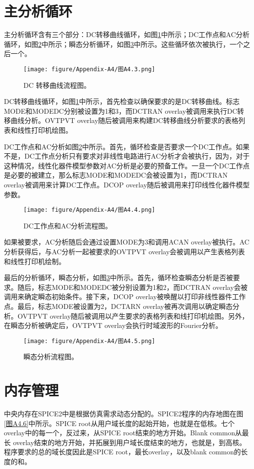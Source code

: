 \section{主分析循环}
主分析循环含有三个部分：DC转移曲线循环，如图\ref{图A4.3}中所示；DC工作点和AC分析循环，如图\ref{图A4.4}中所示；瞬态分析循环，如图\ref{图A4.5}中所示。这些循环依次被执行，一个之后一个。
\begin{figure}[htbp]
\small
    \centering
    \texttt{[image: figure/Appendix-A4/图A4.3.png]}
    \caption{DC 转移曲线流程图。}
    \label{图A4.3}
\end{figure}

DC转移曲线循环，如图\ref{图A4.3}中所示，首先检查以确保要求的是DC转移曲线。标志MODE和MODEDC分别被设置为1和3，而DCTRAN overlay被调用来执行DC转移曲线分析。OVTPVT overlay随后被调用来构建DC转移曲线分析要求的表格列表和线性打印机绘图。

DC工作点和AC分析如图\ref{图A4.4}中所示。首先，循环检查是否要求一个DC工作点。如果不是，DC工作点分析只有要求对非线性电路进行AC分析才会被执行，因为，对于这种情况，线性化器件模型参数对AC分析是必要的预备工作。一旦一个DC工作点是必要的被建立，那么标志MODE和MODEDC会被设置为1，而DCTRAN overlay被调用来计算DC工作点。DCOP overlay随后被调用来打印线性化器件模型参数。

\begin{figure}[htbp]
\small
    \centering
    \texttt{[image: figure/Appendix-A4/图A4.4.png]}
    \caption{DC工作点和AC分析流程图。}
    \label{图A4.4}
\end{figure}

如果被要求，AC分析随后会通过设置MODE为3和调用ACAN overlay被执行。AC分析获得后，与AC分析一起被要求的OVTPVT overlay会被调用以产生表格列表和线性打印机绘制。

最后的分析循环，瞬态分析，如图\ref{图A4.5}中所示。首先，循环检查瞬态分析是否被要求。随后，标志MODE和MODEDC被分别设置为1和2，而DCTRAN overlay会被调用来确定瞬态初始条件。接下来，DCOP overlay被唤醒以打印非线性器件工作点。最后，标志MODE被设置为2，DCTARN overlay被再次调用以确定瞬态分析。OVTPVT overlay随后被调用以产生要求的表格列表和线打印机绘图。另外，在瞬态分析被确定后，OVTPVT overlay会执行时域波形的Fourier分析。

\begin{figure}[htbp]
\small
    \centering
    \texttt{[image: figure/Appendix-A4/图A4.5.png]}
    \caption{瞬态分析流程图。}
    \label{图A4.5}
\end{figure}

\section{内存管理}
中央内存在SPICE2中是根据仿真需求动态分配的。SPICE2程序的内存地图在图\ref{图A4.6}中所示。SPICE root从用户域长度的起始开始，也就是在低核。七个overlay中的每一个，反过来，从SPICE root结束的地方开始。Blank common从最长 overlay结束的地方开始，并拓展到用户域长度结束的地方，也就是，到高核。程序要求的总的域长度因此是SPICE root，最长overlay，以及blank common的长度的和。

